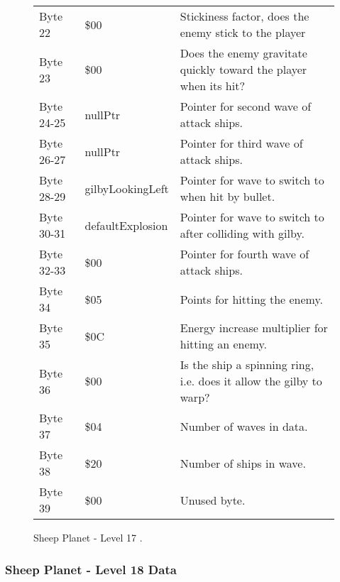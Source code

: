 \begin{figure}[H]
{\begin{adjustbox}{width=12cm}
\begin{tabular}{lll}
 Byte 22    & \$00                        & Stickiness factor, does the enemy stick to the player               \\
 Byte 23    & \$00                        & Does the enemy gravitate quickly toward the player when its hit?    \\
 Byte 24-25 & nullPtr                    & Pointer for second wave of attack ships.                            \\
 Byte 26-27 & nullPtr                    & Pointer for third wave of attack ships.                             \\
 Byte 28-29 & gilbyLookingLeft           & Pointer for wave to switch to when hit by bullet.                   \\
 Byte 30-31 & defaultExplosion           & Pointer for  wave to switch to after colliding with gilby.          \\
 Byte 32-33 & \$00                        & Pointer for fourth wave of attack ships.                            \\
 Byte 34    & \$05                        & Points for hitting the enemy.                                       \\
 Byte 35    & \$0C                        & Energy increase multiplier for hitting an enemy.                    \\
 Byte 36    & \$00                        & Is the ship a spinning ring, i.e. does it allow the gilby to warp?  \\
 Byte 37    & \$04                        & Number of waves in data.                                            \\
 Byte 38    & \$20                        & Number of ships in wave.                                            \\
 Byte 39    & \$00                        & Unused byte.                                                        \\
\bottomrule
\end{tabular}

  \end{adjustbox}

  }\caption*{Sheep Planet - Level 17
.}
\end{figure}

\clearpage
\subsubsection{Sheep Planet - Level 18 Data}

